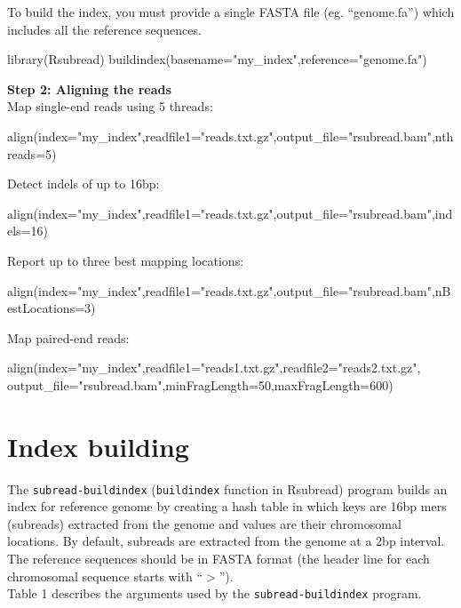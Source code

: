 \documentclass[12pt]{report}
\newcommand{\code}[1]{{\small\texttt{#1}}}
\newcommand{\Rsubread}{\textsf{Rsubread}}
\begin{document}
\noindent To build the index, you must provide a single FASTA file (eg. ``genome.fa'') which includes all the reference sequences.

\begin{Rcode}
library(Rsubread)
buildindex(basename="my_index",reference="genome.fa")
\end{Rcode}

{\noindent\bf Step 2: Aligning the reads}\\

\noindent Map single-end reads using 5 threads:
\begin{Rcode}
align(index="my_index",readfile1="reads.txt.gz",output_file="rsubread.bam",nthreads=5)
\end{Rcode}

\noindent Detect indels of up to 16bp:
\begin{Rcode}
align(index="my_index",readfile1="reads.txt.gz",output_file="rsubread.bam",indels=16)
\end{Rcode}

\noindent Report up to three best mapping locations:
\begin{Rcode}
align(index="my_index",readfile1="reads.txt.gz",output_file="rsubread.bam",nBestLocations=3)
\end{Rcode}

\noindent Map paired-end reads:
\begin{Rcode}
align(index="my_index",readfile1="reads1.txt.gz",readfile2="reads2.txt.gz",
output_file="rsubread.bam",minFragLength=50,maxFragLength=600)
\end{Rcode}


\section{Index building}
\label{sec:index}

The \code{subread-buildindex} (\code{buildindex} function in \Rsubread) program builds an index for reference genome by creating a hash table in which keys are 16bp mers (subreads) extracted from the genome and values are their chromosomal locations.
By default, subreads are extracted from the genome at a 2bp interval.
The reference sequences should be in FASTA format (the header line for each chromosomal sequence starts with ``$>$'').\\

Table 1 describes the arguments used by the \code{subread-buildindex} program.

\newpage
\end{document}
